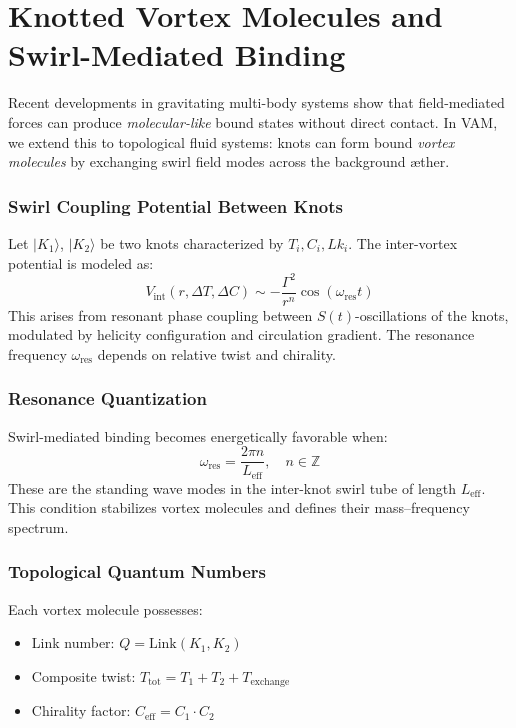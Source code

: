 \documentclass[12pt]{article}
\begin{document}
\section{Knotted Vortex Molecules and Swirl-Mediated Binding}

Recent developments in gravitating multi-body systems show that field-mediated forces can produce \emph{molecular-like} bound states without direct contact. In VAM, we extend this to topological fluid systems: knots can form bound \textit{vortex molecules} by exchanging swirl field modes across the background æther.

\subsubsection*{Swirl Coupling Potential Between Knots}

Let \( |K_1\rangle \), \( |K_2\rangle \) be two knots characterized by \( T_i, C_i, Lk_i \). The inter-vortex potential is modeled as:
\[
V_{\text{int}}(r, \Delta T, \Delta C) \sim -\frac{\Gamma^2}{r^n} \cos(\omega_{\text{res}} t)
\]
This arises from resonant phase coupling between \( S(t) \)-oscillations of the knots, modulated by helicity configuration and circulation gradient. The resonance frequency \( \omega_{\text{res}} \) depends on relative twist and chirality.

\subsubsection*{Resonance Quantization}

Swirl-mediated binding becomes energetically favorable when:
\[
\omega_{\text{res}} = \frac{2\pi n}{L_{\text{eff}}}, \quad n \in \mathbb{Z}
\]
These are the standing wave modes in the inter-knot swirl tube of length \( L_{\text{eff}} \). This condition stabilizes vortex molecules and defines their mass–frequency spectrum.

\subsubsection*{Topological Quantum Numbers}

Each vortex molecule possesses:
\begin{itemize}
  \item Link number: \( Q = \text{Link}(K_1, K_2) \)
  \item Composite twist: \( T_{\text{tot}} = T_1 + T_2 + T_{\text{exchange}} \)
  \item Chirality factor: \( C_{\text{eff}} = C_1 \cdot C_2 \)
\end{itemize}
\end{document}
